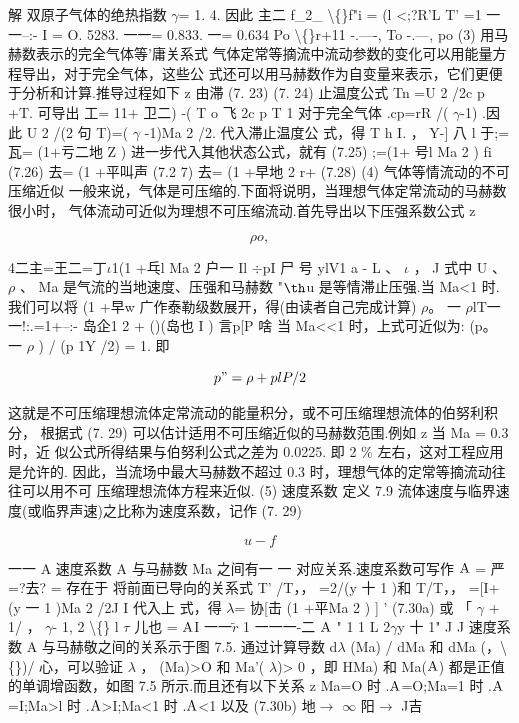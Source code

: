 解 双原子气体的绝热指数 $\gamma$= 1. 4. 因此 主二 f\_2\_ \textbackslash\{\}f"i = (l <;?R'L T' =1 一一--:- I = O. 5283. 一一= 0.833. 一= 0.634 Po \textbackslash\{\}r+11 -.----, To -.---, po (3) 用马赫数表示的完全气体等'庸关系式 气体定常等摘流中流动参数的变化可以用能量方程导出，对于完全气体，这些公 式还可以用马赫数作为自变量来表示，它们更便于分析和计算.推导过程如下 z 由滞 (7. 23) (7. 24) 止温度公式 Tn =U 2 /2c p +T. 可导出 工= 11+ 卫二) -( T o 飞 2c p T 1 对于完全气体 .cp=rR /( $\gamma$-1) .因此 U 2 /(2 句 T)=( $\gamma$ -1)Ma 2 /2. 代入滞止温度公 式，得 T h I. ， Y-] 八 l 于;=瓦= (1+亏二地 Z ) 进一步代入其他状态公式，就有 (7.25) ;=(1+ 号l Ma 2 ) f${\rm i}$ (7.26) 去= (1 +平叫声 (7.2 7) 去= (1 +早地 2 r+ (7.28) (4) 气体等情流动的不可压缩近似 一般来说，气体是可压缩的.下面将说明，当理想气体定常流动的马赫数很小时， 气体流动可近似为理想不可压缩流动.首先导出以下压强系数公式 z

\[\rho  o ,\]

4二主=王二=丁$\iota$1(1 +乓l Ma 2 户一 Il $\div$pI 尸 号 ylV1 a - L 、 $\iota$ ， J 式中 U 、 $\rho$ 、 Ma 是气流的当地速度、压强和马赫数 "${\rm þ}$u 是等情滞止压强.当 Ma<1 时. 我们可以将 (1 +早w 广作泰勒级数展开，得(由读者自己完成计算) $\rho$。 一 $\rho$lT一一!:.=1+--:- 岛企1 2 + ()(岛也 I ) 言p[P 啥 当 Ma<<1 时，上式可近似为: (p。 一 $\rho$ ) / (p 1Y /2) = 1. 即

\[p" = \rho  +plP / 2\]

这就是不可压缩理想流体定常流动的能量积分，或不可压缩理想流体的伯努利积分， 根据式 (7. 29) 可以估计适用不可压缩近似的马赫数范围.例如 z 当 Ma = 0.3 时，近 似公式所得结果与伯努利公式之差为 0.0225. 即 2 \% 左右，这对工程应用是允许的. 因此，当流场中最大马赫数不超过 0.3 时，理想气体的定常等摘流动往往可以用不可 压缩理想流体方程来近似. (5) 速度系数 定义 7.9 流体速度与临界速度(或临界声速)之比称为速度系数，记作 (7. 29)

\[u-f\]

一一 A 速度系数 A 与马赫数 Ma 之间有一 一 对应关系.速度系数可写作 ${\rm A}$ = 严=?去? = 存在于 将前面已导向的关系式 T' /T，， =2/(y 十 1 )和 T/T，， =[I+(y 一 1 )Ma 2 /2J I 代入上 式，得 $\lambda$= 协[击 (1 +平Ma 2 ) ] ' (7.30a) 或 「 $\gamma$ + 1/ ， $\gamma$- 1, 2 \textbackslash\{\} l $\tau$ 儿也 = ${\rm A}$I 一一$\tilde{r}$ 1 一一一-二 ${\rm A}$ " 1 1 L 2$\gamma$y 十 1" J J 速度系数 A 与马赫敬之间的关系示于图 7.5. 通过计算导数 d$\lambda$ (Ma) / dMa 和 dMa (，\textbackslash\{\})/ 心，可以验证 $\lambda$ ， (Ma)>O 和 Ma'( $\lambda$)> 0 ，即 HMa) 和 Ma(${\rm A}$) 都是正值的单调增函数，如图 7.5 所示.而且还有以下关系 z Ma=O 时 .${\rm A}$=O;Ma=1 时 .${\rm A}$=I;Ma>l 时 .${\rm A}$>I;Ma<1 时 .${\rm A}$<1 以及 (7.30b) 地$\rightarrow$ $\infty$ 阳$\rightarrow$ J吉

